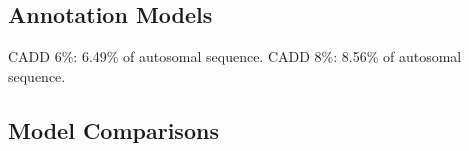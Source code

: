 \documentclass[11pt]{article}
\begin{document}

\subsection{Annotation Models}


CADD 6\%: 6.49\% of autosomal sequence.
CADD 8\%: 8.56\% of autosomal sequence.



\subsection{Model Comparisons}

\end{document}
